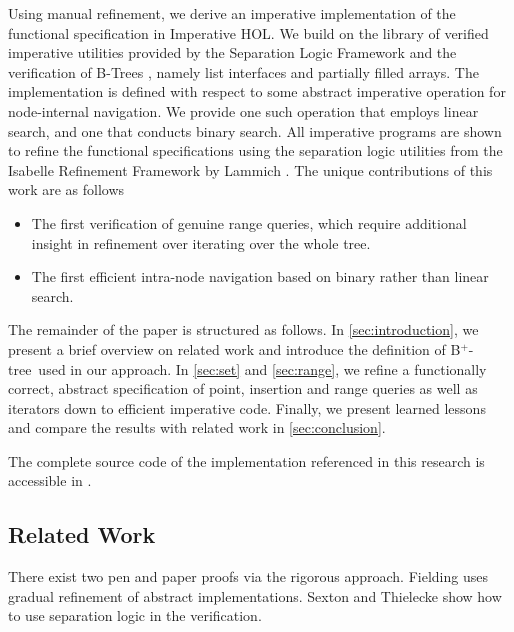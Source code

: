 \documentclass[a4paper,UKenglish,cleveref, autoref, thm-restate]{lipics-v2021}
\newcommand{\btree}{B$^+$-tree}
\begin{document}
Using manual refinement, we derive an imperative implementation of the functional specification
in Imperative HOL.
We build on the library of verified imperative utilities
provided by the Separation Logic Framework \cite{DBLP:journals/afp/LammichM12}
and the verification of B-Trees \cite{DBLP:journals/afp/Mundler21},
namely list interfaces and partially filled arrays.
The implementation is defined with respect to some abstract imperative
operation for node-internal navigation.
We provide one such operation that employs linear search,
and one that conducts binary search.
All imperative programs are shown to refine the functional specifications
using the separation logic utilities from the Isabelle Refinement Framework by
Lammich \cite{DBLP:journals/jar/Lammich19}. The unique contributions of this work are as follows
\begin{itemize}
   \item The first verification of genuine range queries,
         which require additional insight in refinement over iterating over the whole tree.
   \item The first efficient intra-node navigation based on binary rather than linear search.
\end{itemize}

The remainder of the paper is structured as follows.
In \autoref{sec:introduction}, we present a brief overview on related
work and introduce the definition of \btree\ used in our approach.
In \autoref{sec:set} and \autoref{sec:range},
we refine a functionally correct, abstract specification of
point, insertion and range queries as well as iterators
down to efficient imperative code.
Finally, we present learned lessons and compare the results with related work
in \autoref{sec:conclusion}.

The complete source code of the implementation referenced in this research
is accessible in \cite{MuendlerAppendix22}.

\subsection{Related Work}
\label{sec:related_work}

There exist two pen and paper proofs via the rigorous approach.
Fielding \cite{Fielding80} uses gradual refinement of abstract
implementations.
Sexton and Thielecke \cite{DBLP:journals/entcs/SextonT08} show how to use 
separation logic in the verification.
\end{document}
